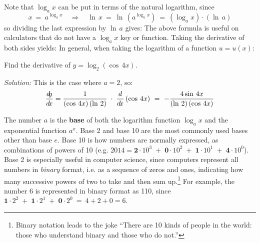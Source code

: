 Note that $\log_a x$ can be put in terms of the natural logarithm, since
\[
x ~=~ a^{\log_a x} \quad\Rightarrow\quad \ln\,x ~=~ \ln\,\left(a^{\log_a x}\right) ~=~
      (\log_a x) \cdot (\ln\,a)
\]
so dividing the last expression by $\ln\,a$ gives:
\statecomment{\[ \log_a x ~=~ \frac{\ln\,x}{\ln\,a} \]}
The above formula is useful on calculators that do not have a $\log_a x$ key or
function. Taking the derivative of both sides yields:
\newpage
{}
In general, when taking the logarithm of a function $u = u(x)$:

\begin{exmp}
Find the derivative of $y = \log_2 (\cos\,4x)$.\vspace{1mm}
\par\noindent\emph{Solution:} This is the case where $a = 2$, so:
\[
\frac{d\negmedspace y}{d\!x} = \frac{1}{(\cos\,4x)\,(\ln\,2)} \;\cdot\; \frac{d}{d\!x}\,(\cos\,4x)
~=~ -\frac{4 \sin\,4x}{(\ln\,2)\,(\cos\,4x)}
\]
\end{exmp}
\divider
\vspace{3mm}

The number $a$ is the \textbf{base} of both the logarithm function $\log_a x$
and the exponential function $a^x$.
Base 2 and base 10 are the most commonly used bases other than base $e$.
Base 10 is how numbers are normally expressed, as combinations of powers
of 10 (e.g. $2014 = \bm{2} \cdot 10^3 \;+\; \bm{0} \cdot 10^2 \;+\;
\bm{1} \cdot 10^1 \;+\; \bm{4} \cdot 10^0$).
Base 2 is especially useful in computer science, since computers represent
all numbers in \emph{binary} format, i.e. as a sequence of zeros and ones,
indicating how many successive powers of two to take and then sum
up.\footnote{Binary notation leads to the joke
``There are 10 kinds of people in the world: those who understand binary and
those who do not.''}
For example, the number 6 is represented in binary format as 110,
since $\bm{1} \cdot 2^2 \;+\; \bm{1} \cdot 2^1 \;+\;
\bm{0} \cdot 2^0 ~=~ 4 + 2 + 0 = 6$.\vspace{2mm}

